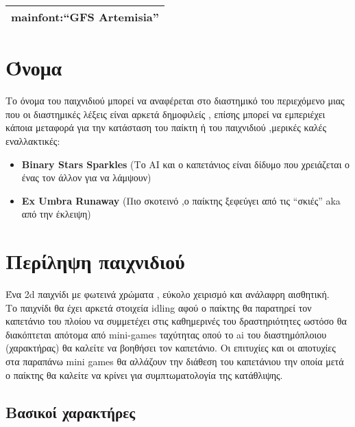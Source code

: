 \documentclass[
]{article}
\author{}
\date{}
\providecommand{\tightlist}{%
  \setlength{\itemsep}{0pt}\setlength{\parskip}{0pt}}
\begin{document}
\begin{longtable}[]{@{}l@{}}
\toprule
\endhead
mainfont:``GFS Artemisia'' \\
\bottomrule
\end{longtable}

\hypertarget{ux3ccux3bdux3bfux3bcux3b1}{%
\section{Όνομα}\label{ux3ccux3bdux3bfux3bcux3b1}}

Το όνομα του παιχνιδιού μπορεί να αναφέρεται στο διαστημικό του
περιεχόμενο μιας που οι διαστημικές λέξεις είναι αρκετά δημοφιλείς ,
επίσης μπορεί να εμπεριέχει κάποια μεταφορά για την κατάσταση του παίκτη
ή του παιχνιδιού ,μερικές καλές εναλλακτικές:

\begin{itemize}
\tightlist
\item
  \textbf{Binary Stars Sparkles} (Το AI και ο καπετάνιος είναι δίδυμο
  που χρειάζεται ο ένας τον άλλον για να λάμψουν)
\item
  \textbf{Ex Umbra Runaway} (Πιο σκοτεινό ,ο παίκτης ξεφεύγει από τις
  ``σκιές'' aka από την έκλειψη)
\end{itemize}

\hypertarget{ux3c0ux3b5ux3c1ux3afux3bbux3b7ux3c8ux3b7-ux3c0ux3b1ux3b9ux3c7ux3bdux3b9ux3b4ux3b9ux3bfux3cd}{%
\section{Περίληψη
παιχνιδιού}\label{ux3c0ux3b5ux3c1ux3afux3bbux3b7ux3c8ux3b7-ux3c0ux3b1ux3b9ux3c7ux3bdux3b9ux3b4ux3b9ux3bfux3cd}}

Ένα 2d παιχνίδι με φωτεινά χρώματα , εύκολο χειρισμό και ανάλαφρη
αισθητική.\\
Το παιχνίδι θα έχει αρκετά στοιχεία idling αφού ο παίκτης θα παρατηρεί
τον καπετάνιο του πλοίου να συμμετέχει στις καθημερινές του
δραστηριότητες ωστόσο θα διακόπτεται απότομα από mini-games ταχύτητας
οπού το ai του διαστημόπλοιου (χαρακτήρας) θα καλείτε να βοηθήσει τον
καπετάνιο. Οι επιτυχίες και οι αποτυχίες στα παραπάνω mini games θα
αλλάζουν την διάθεση του καπετάνιου την οποία μετά ο παίκτης θα καλείτε
να κρίνει για συμπτωματολογία της κατάθλιψης.

\hypertarget{ux3b2ux3b1ux3c3ux3b9ux3baux3bfux3af-ux3c7ux3b1ux3c1ux3b1ux3baux3c4ux3aeux3c1ux3b5ux3c2}{%
\subsection{Βασικοί
χαρακτήρες}\label{ux3b2ux3b1ux3c3ux3b9ux3baux3bfux3af-ux3c7ux3b1ux3c1ux3b1ux3baux3c4ux3aeux3c1ux3b5ux3c2}}
\end{document}
